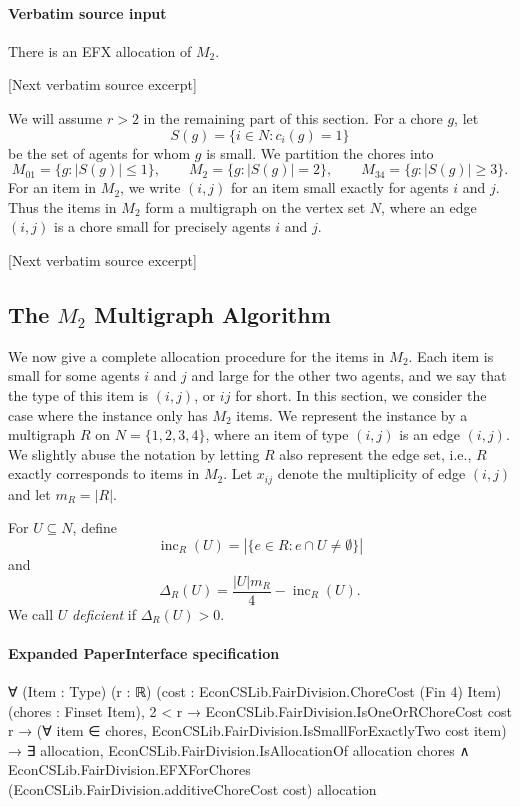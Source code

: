 \documentclass[10pt]{article}
\begin{document}
\paragraph{Verbatim source input}
\begin{ReviewVerbatim}
\begin{lemma}\label{lem:M2}
There is an EFX allocation of $M_2$.
\end{lemma}

[Next verbatim source excerpt]

We will assume $r>2$ in the remaining part of this section.
For a chore $g$, let
\[
 S(g)=\{i\in N:c_i(g)=1\}
\]
be the set of agents for whom $g$ is small.  We partition the chores into
\[
M_{01}=\{g:|S(g)|\le 1\},\qquad
M_2=\{g:|S(g)|=2\},\qquad
M_{34}=\{g:|S(g)|\ge 3\}.
\]
For an item in $M_2$, we write $(i,j)$ for an item small exactly for agents
$i$ and $j$.  Thus the items in $M_2$ form a multigraph on the vertex set
$N$, where an edge $(i,j)$ is a chore small for precisely agents $i$ and $j$.

[Next verbatim source excerpt]

\subsection{The $M_2$ Multigraph Algorithm}
\label{subsec:2}
We now give a complete allocation procedure for the items in $M_2$.
Each item is small for some agents $i$ and $j$ and
large for the other two agents, and we say that the type of this item is $(i,j)$, or $ij$ for short.
In this section, we consider the case where the instance only has $M_{2}$ items.
We represent the instance by a
multigraph $R$ on $N=\{1,2,3,4\}$, where an item of type $(i,j)$ is an edge $(i,j)$.
We slightly abuse the notation by letting $R$ also represent the edge set, i.e., $R$ exactly corresponds to items in $M_2$.
Let $x_{ij}$ denote the multiplicity of edge $(i,j)$ and let $m_R=|R|$.

For $U\subseteq N$, define
\[
 \operatorname{inc}_R(U)=\left|\{e\in R:e\cap U\neq\emptyset\}\right|
\]
and
\[
 \Delta_R(U)=\frac{|U|m_R}{4}-\operatorname{inc}_R(U).
\]
We call $U$ \emph{deficient} if $\Delta_R(U)>0$.
\end{ReviewVerbatim}


\paragraph{Expanded PaperInterface specification}
\begin{ReviewVerbatim}
∀ (Item : Type) (r : ℝ) (cost : EconCSLib.FairDivision.ChoreCost (Fin 4) Item) (chores : Finset Item),
  2 < r →
    EconCSLib.FairDivision.IsOneOrRChoreCost cost r →
      (∀ item ∈ chores, EconCSLib.FairDivision.IsSmallForExactlyTwo cost item) →
        ∃ allocation,
          EconCSLib.FairDivision.IsAllocationOf allocation chores ∧
            EconCSLib.FairDivision.EFXForChores (EconCSLib.FairDivision.additiveChoreCost cost) allocation
\end{ReviewVerbatim}
\end{document}
